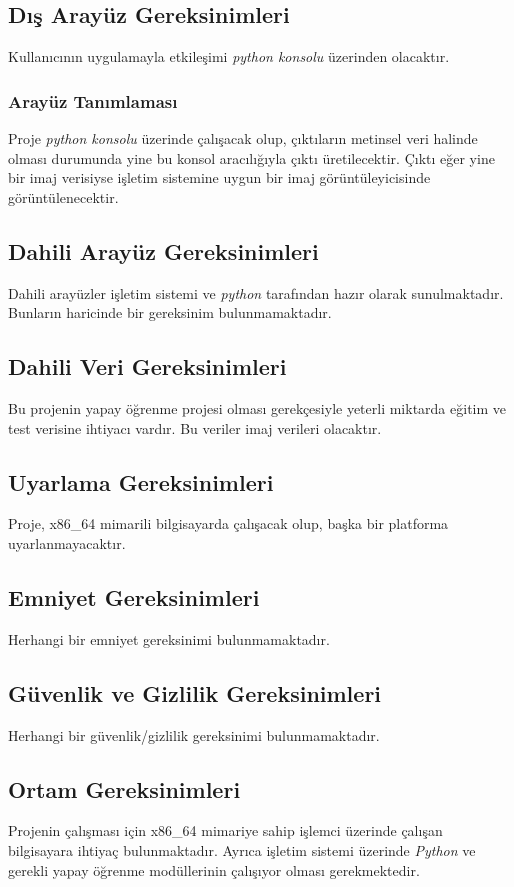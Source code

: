 \documentclass[12pt,a4paper]{article}
\begin{document}
   \subsection{Dış Arayüz Gereksinimleri}
   Kullanıcının uygulamayla etkileşimi \textit{python konsolu} üzerinden olacaktır.

   \subsubsection{Arayüz Tanımlaması} \label{ara}
   Proje \textit{python konsolu} üzerinde çalışacak olup, çıktıların metinsel veri halinde olması durumunda yine bu konsol aracılığıyla çıktı üretilecektir. Çıktı eğer yine bir imaj verisiyse işletim sistemine uygun bir imaj görüntüleyicisinde görüntülenecektir. 

   \subsection{Dahili Arayüz Gereksinimleri}
   Dahili arayüzler işletim sistemi ve \textit{python} tarafından hazır olarak sunulmaktadır. Bunların haricinde bir gereksinim bulunmamaktadır.

   \subsection{Dahili Veri Gereksinimleri}
   Bu projenin yapay öğrenme projesi olması gerekçesiyle yeterli miktarda eğitim ve test verisine ihtiyacı vardır. Bu veriler imaj verileri olacaktır.

   \subsection{Uyarlama Gereksinimleri}
   Proje, x86\_64 mimarili bilgisayarda çalışacak olup, başka bir platforma uyarlanmayacaktır.

   \subsection{Emniyet Gereksinimleri}
   Herhangi bir emniyet gereksinimi bulunmamaktadır.

   \subsection{Güvenlik ve Gizlilik Gereksinimleri}
   Herhangi bir güvenlik/gizlilik gereksinimi bulunmamaktadır.

   \subsection{Ortam Gereksinimleri} \label{ortam}
   Projenin çalışması için x86\_64 mimariye sahip işlemci üzerinde çalışan bilgisayara ihtiyaç bulunmaktadır. Ayrıca işletim sistemi üzerinde \textit{Python} ve gerekli yapay öğrenme modüllerinin çalışıyor olması gerekmektedir.
\end{document}
